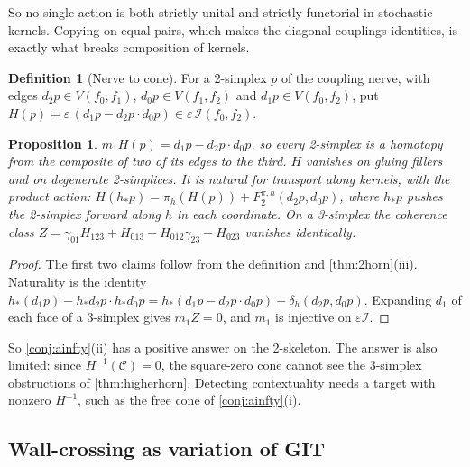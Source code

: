 \documentclass[11pt]{article}
\newtheorem{proposition}[theorem]{Proposition}
\theoremstyle{definition}
\newtheorem{definition}[theorem]{Definition}
\theoremstyle{remark}
\begin{document}
So no single action is both strictly unital and strictly functorial in stochastic kernels. Copying on equal pairs, which
makes the diagonal couplings identities, is exactly what breaks composition of kernels.

\begin{definition}[Nerve to cone]\label{def:nervecone}
For a 2-simplex $p$ of the coupling nerve, with edges $d_2p\in V(f_0,f_1)$, $d_0p\in V(f_1,f_2)$ and $d_1p\in V(f_0,f_2)$, put
$H(p)=\varepsilon\,(d_1p-d_2p\cdot d_0p)\in\varepsilon\,\mathcal I(f_0,f_2)$.
\end{definition}

\begin{proposition}\label{prop:nervecone}
$m_1H(p)=d_1p-d_2p\cdot d_0p$, so every 2-simplex is a homotopy from the composite of two of its edges to the third. $H$
vanishes on gluing fillers and on degenerate 2-simplices. It is natural for transport along kernels, with the product action:
$H(h_*p)=\pi_h(H(p))+F_2^{\pi,h}(d_2p,d_0p)$, where $h_*p$ pushes the 2-simplex forward along $h$ in each coordinate. On a 3-simplex the coherence class
$Z=\gamma_{01}H_{123}+H_{013}-H_{012}\gamma_{23}-H_{023}$ vanishes identically.
\end{proposition}
\begin{proof}
The first two claims follow from the definition and \cref{thm:2horn}(iii). Naturality is the identity
$h_*(d_1p)-h_*d_2p\cdot h_*d_0p=h_*(d_1p-d_2p\cdot d_0p)+\delta_h(d_2p,d_0p)$. Expanding $d_1$ of each face of a 3-simplex
gives $m_1Z=0$, and $m_1$ is injective on $\varepsilon\mathcal I$.
\end{proof}

So \cref{conj:ainfty}(ii) has a positive answer on the 2-skeleton. The answer is also limited: since $H^{-1}(\mathcal C)=0$, the
square-zero cone cannot see the 3-simplex obstructions of \cref{thm:higherhorn}. Detecting contextuality needs a target with
nonzero $H^{-1}$, such as the free cone of \cref{conj:ainfty}(i).

\subsection{Wall-crossing as variation of GIT}\label{sec:vgit}
\end{document}
